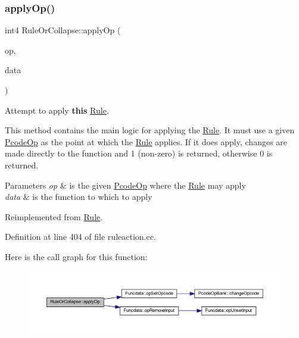 \subsubsection{\texorpdfstring{applyOp()}{applyOp()}}
{\footnotesize\ttfamily int4 Rule\+Or\+Collapse\+::apply\+Op (\begin{DoxyParamCaption}\item[{\mbox{\hyperlink{class_pcode_op}{Pcode\+Op}} $\ast$}]{op,  }\item[{\mbox{\hyperlink{class_funcdata}{Funcdata}} \&}]{data }\end{DoxyParamCaption})\hspace{0.3cm}{\ttfamily [virtual]}}



Attempt to apply {\bfseries{this}} \mbox{\hyperlink{class_rule}{Rule}}. 

This method contains the main logic for applying the \mbox{\hyperlink{class_rule}{Rule}}. It must use a given \mbox{\hyperlink{class_pcode_op}{Pcode\+Op}} as the point at which the \mbox{\hyperlink{class_rule}{Rule}} applies. If it does apply, changes are made directly to the function and 1 (non-\/zero) is returned, otherwise 0 is returned. 
\begin{DoxyParams}{Parameters}
{\em op} & is the given \mbox{\hyperlink{class_pcode_op}{Pcode\+Op}} where the \mbox{\hyperlink{class_rule}{Rule}} may apply \\
\hline
{\em data} & is the function to which to apply \\
\hline
\end{DoxyParams}


Reimplemented from \mbox{\hyperlink{class_rule_a4e3e61f066670175009f60fb9dc60848}{Rule}}.



Definition at line 404 of file ruleaction.\+cc.

Here is the call graph for this function\+:
\nopagebreak
\begin{figure}[H]
\begin{center}
\leavevmode
\includegraphics[width=350pt]{class_rule_or_collapse_a2b43549e7241357eb9b4c22857270ba1_cgraph}
\end{center}
\end{figure}
\mbox{\label{class_rule_or_collapse_a30212e0187d8a14ebe2b8adbd396b29a}} 
